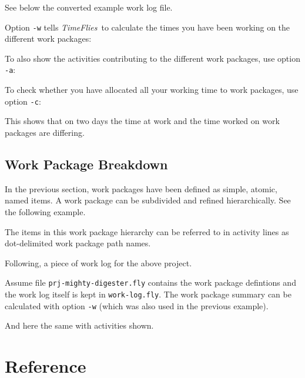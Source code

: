 \documentclass[11pt]{article}
\newcommand{\timeflies}{\emph{TimeFlies}}
\begin{document}
See below the converted example work log file.



Option \verb:-w: tells \timeflies\ to calculate the times you have been working on the different work packages:



To also show the activities contributing to the different work packages, use option \verb:-a::



To check whether you have allocated all your working time to work packages, use option \verb:-c::



This shows that on two days the time at work and the time worked on work packages are differing.

\subsection{Work Package Breakdown}

In the previous section, work packages have been defined as simple, atomic, named items. A work package can be subdivided and refined hierarchically. See the following example.



The items in this work package hierarchy can be referred to in activity lines as dot-delimited work package path names.

Following, a piece of work log for the above project.



Assume file \verb:prj-mighty-digester.fly: contains the work package defintions and the work log itself is kept in \verb:work-log.fly:. The work package summary can be calculated with option \verb:-w: (which was also used in the previous example).



And here the same with activities shown.




\section{Reference}
\end{document}
